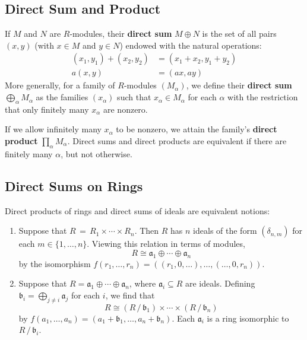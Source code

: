 \documentclass[11pt]{article}
\begin{document}

\subsection{Direct Sum and Product}

If $M$ and $N$ are $R$-modules, their \textbf{direct sum} $M \oplus N$ is the set of all pairs $(x, y)$ (with $x \in M$ and $y \in N$) endowed with the natural operations:
\begin{align*}
	(x_{1}, y_{1}) + (x_{2}, y_{2}) & = (x_{1} + x_{2}, y_{1} + y_{2}) \\
	                        a(x, y) & = (ax, ay)
\end{align*}
More generally, for a family of $R$-modules $(M_{\alpha})$, we define their \textbf{direct sum} $\bigoplus_{\alpha} M_{\alpha}$ as the families $(x_{\alpha})$ such that $x_{\alpha} \in M_{\alpha}$ for each $\alpha$ with the restriction that only finitely many $x_{\alpha}$ are nonzero.

If we allow infinitely many $x_{\alpha}$ to be nonzero, we attain the family's \textbf{direct product} $\prod_{\alpha} M_{\alpha}$. Direct sums and direct products are equivalent if there are finitely many $\alpha$, but not otherwise.

\newpage

\subsection{Direct Sums on Rings}

Direct products of rings and direct sums of ideals are equivalent notions:
\begin{enumerate}
  \item Suppose that $R \, = \, R_{1} \times \cdots \times R_{n}$. Then $R$ has $n$ ideals of the form $(\delta_{n, m})$ for each $m \in \{ 1, \ldots, n \}$. Viewing this relation in terms of modules,
  \[
  	R \cong \mathfrak{a}_{1} \oplus \cdots \oplus \mathfrak{a}_{n}
  \]
  by the isomorphism $f(r_{1}, \ldots, r_{n}) = ((r_{1}, 0, \ldots), \ldots, (\ldots, 0, r_{n}))$.
  \item Suppose that $R = \mathfrak{a}_{1} \oplus \cdots \oplus \mathfrak{a}_{n}$, where $\mathfrak{a}_{i} \subseteq R$ are ideals. Defining $\mathfrak{b}_{i} = \bigoplus_{j \ne i} \mathfrak{a}_{j}$ for each $i$, we find that
  \[
	  R \cong (R \,/\, \mathfrak{b}_{1}) \times \cdots \times (R \,/\, \mathfrak{b}_{n})
  \]
  by $f(a_{1}, \ldots, a_{n}) = (a_{1} + \mathfrak{b}_{1}, \ldots, a_{n} + \mathfrak{b}_{n})$. Each $\mathfrak{a}_{i}$ is a ring isomorphic to $R \, / \, \mathfrak{b}_{i}$.
\end{enumerate}
\end{document}
